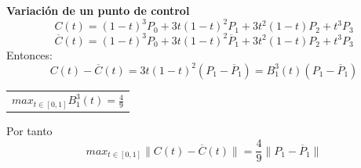 \documentclass[twoside]{report}
\newcommand{\colocapdf}[2]{\quad\pdfimage width #2 {pdfs/#1.pdf}}
\begin{document}
%
%
%
%
%
%
%
{\bf Variaci\'{o}n de un punto de control}
$$C(t)=(1-t)^3P_0+3t(1-t)^2P_1+3t^2(1-t)P_2+t^3P_3$$
$$\overline{C}(t)=(1-t)^3P_0+3t(1-t)^2\overline{P}_1+3t^2(1-t)P_2+t^3P_3$$
Entonces:
$$C(t)-\overline{C}(t)=3t(1-t)^2(P_1-\overline{P}_1)=B_1^3(t)(P_1-\overline{P}_1)$$
\begin{center}
\begin{minipage}{0.55\textwidth}
\begin{tabular}{c} $max_{t\in[0,1]}B_1^3(t)=\frac{4}{9}$
\end{tabular}
\end{minipage}
\end{center}
Por tanto
$$max_{t\in[0,1]}\parallel C(t)-\overline{C}(t)\parallel
=\frac{4}{9}\parallel P_1-\overline{P}_1\parallel$$
\end{document}
